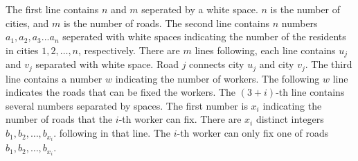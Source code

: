 The first line contains $n$ and $m$ seperated by a white space.
$n$ is the number of cities, and $m$ is the number of roads.
The second line contains $n$ numbers $a_1,a_2,a_3...a_n$ seperated 
with white spaces indicating the number of the residents in cities $1,2,\dots,n$, respectively.
There are $m$ lines following, each line contains $u_j$ and $v_j$ 
separated with white space. Road $j$ 
connects city $u_j$ and city $v_j$. 
The third line contains a number $w$ indicating the number of workers.
The following $w$ line indicates the roads that can be fixed the workers.
The $(3+i)$-th line contains several numbers separated by spaces. 
The first number is $x_i$ indicating the number of roads 
that the $i$-th worker can fix.
There are $x_i$ distinct integers 
$b_1,b_2,\dots,b_{x_i}$. 
following in that line.
The $i$-th worker can only fix one of roads $b_1,b_2,\dots,b_{x_i}$.
